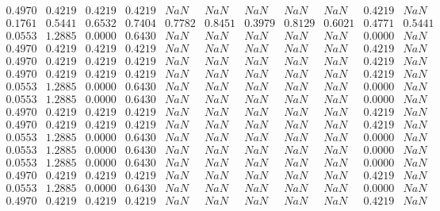     \begin{small}
        ~
        \[\begin{array}{llllllllllllllll}
              0.4970 & 0.4219 & 0.4219 & 0.4219 & NaN    & NaN    & NaN    & NaN    & NaN    & 0.4219 & NaN    \\
              0.1761 & 0.5441 & 0.6532 & 0.7404 & 0.7782 & 0.8451 & 0.3979 & 0.8129 & 0.6021 & 0.4771 & 0.5441 \\
              0.0553 & 1.2885 & 0.0000 & 0.6430 & NaN    & NaN    & NaN    & NaN    & NaN    & 0.0000 & NaN    \\
              0.4970 & 0.4219 & 0.4219 & 0.4219 & NaN    & NaN    & NaN    & NaN    & NaN    & 0.4219 & NaN    \\
              0.4970 & 0.4219 & 0.4219 & 0.4219 & NaN    & NaN    & NaN    & NaN    & NaN    & 0.4219 & NaN    \\
              0.4970 & 0.4219 & 0.4219 & 0.4219 & NaN    & NaN    & NaN    & NaN    & NaN    & 0.4219 & NaN    \\
              0.0553 & 1.2885 & 0.0000 & 0.6430 & NaN    & NaN    & NaN    & NaN    & NaN    & 0.0000 & NaN    \\
              0.0553 & 1.2885 & 0.0000 & 0.6430 & NaN    & NaN    & NaN    & NaN    & NaN    & 0.0000 & NaN    \\
              0.4970 & 0.4219 & 0.4219 & 0.4219 & NaN    & NaN    & NaN    & NaN    & NaN    & 0.4219 & NaN    \\
              0.4970 & 0.4219 & 0.4219 & 0.4219 & NaN    & NaN    & NaN    & NaN    & NaN    & 0.4219 & NaN    \\
              0.0553 & 1.2885 & 0.0000 & 0.6430 & NaN    & NaN    & NaN    & NaN    & NaN    & 0.0000 & NaN    \\
              0.0553 & 1.2885 & 0.0000 & 0.6430 & NaN    & NaN    & NaN    & NaN    & NaN    & 0.0000 & NaN    \\
              0.0553 & 1.2885 & 0.0000 & 0.6430 & NaN    & NaN    & NaN    & NaN    & NaN    & 0.0000 & NaN    \\
              0.4970 & 0.4219 & 0.4219 & 0.4219 & NaN    & NaN    & NaN    & NaN    & NaN    & 0.4219 & NaN    \\
              0.0553 & 1.2885 & 0.0000 & 0.6430 & NaN    & NaN    & NaN    & NaN    & NaN    & 0.0000 & NaN    \\
              0.4970 & 0.4219 & 0.4219 & 0.4219 & NaN    & NaN    & NaN    & NaN    & NaN    & 0.4219 & NaN
        \end{array}\]
    \end{small}



